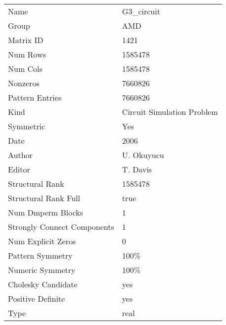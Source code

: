 \begin{tabular}{ll}
\midrule
                       Name &                 G3\_circuit \\
                      Group &                        AMD \\
                  Matrix ID &                       1421 \\
                   Num Rows &                    1585478 \\
                   Num Cols &                    1585478 \\
                   Nonzeros &                    7660826 \\
            Pattern Entries &                    7660826 \\
                       Kind & Circuit Simulation Problem \\
                  Symmetric &                        Yes \\
                       Date &                       2006 \\
                     Author &                 U. Okuyucu \\
                     Editor &                   T. Davis \\
            Structural Rank &                    1585478 \\
       Structural Rank Full &                       true \\
          Num Dmperm Blocks &                          1 \\
Strongly Connect Components &                          1 \\
         Num Explicit Zeros &                          0 \\
           Pattern Symmetry &                       100\% \\
           Numeric Symmetry &                       100\% \\
         Cholesky Candidate &                        yes \\
          Positive Definite &                        yes \\
                       Type &                       real \\
\bottomrule
\end{tabular}
